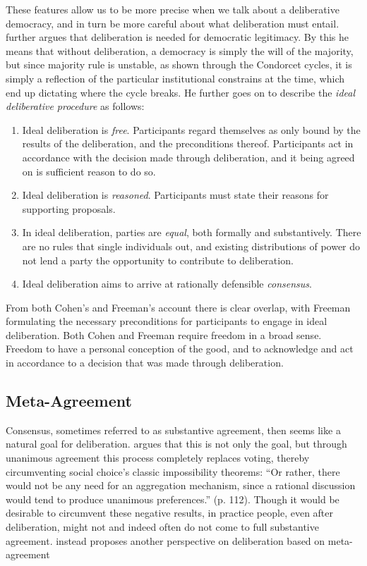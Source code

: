 These features allow us to be more precise when we talk about a deliberative
democracy, and in turn be more careful about what deliberation must entail.
\citet{cohenDeliberationDemocraticLegimitimacy2002} further argues that
deliberation is needed for democratic legitimacy. By this he means that without
deliberation, a democracy is simply the will of the majority, but since
majority rule is unstable, as shown through the Condorcet cycles, it is simply
a reflection of the particular institutional constrains at the time, which end
up dictating where the cycle breaks. He further goes on to describe the
\emph{ideal deliberative procedure} as follows:

\begin{enumerate}
	\label{list:ideal-deliberation}
	\setlength\itemsep{1px}
	\item  Ideal deliberation is \emph{free}. Participants regard themselves as only bound by the results of the deliberation, and the preconditions thereof. Participants act in accordance with the decision made through deliberation, and it being agreed on is sufficient reason to do so.
	\item  Ideal deliberation is \emph{reasoned}. Participants must
	      state their reasons for supporting proposals.
	\item  In ideal deliberation, parties are \emph{equal}, both formally
	      and substantively. There are no rules that single individuals
	      out, and existing distributions of power do not lend a party the
	      opportunity to contribute to deliberation.
	\item  Ideal deliberation aims to arrive at rationally defensible \emph{consensus}.
\end{enumerate}

From both Cohen's and Freeman's account there is clear overlap, with Freeman
formulating the necessary preconditions for participants to engage in ideal
deliberation. Both Cohen and Freeman  require freedom in a broad sense. Freedom
to have a personal conception of the good, and to acknowledge and act in
accordance to a decision that was made through deliberation.

\subsection{Meta-Agreement}
\label{subsection:Meta-agreement}

Consensus, sometimes referred to as substantive agreement, then seems like a
natural goal for deliberation. \citet{elsterMarketForumThree2002} argues that
this is not only the goal, but through unanimous agreement this process
completely replaces voting, thereby circumventing social choice's classic impossibility
theorems: ``Or rather, there would not be any need for an aggregation mechanism,
since a rational discussion would tend to produce unanimous preferences.'' (p.
112). Though it would be desirable to circumvent these negative results,
in practice people, even after deliberation, might not and indeed often do not
come to full substantive agreement. \citet{listTwoConceptsAgreement2002}
instead proposes another perspective  on deliberation based on meta-agreement

